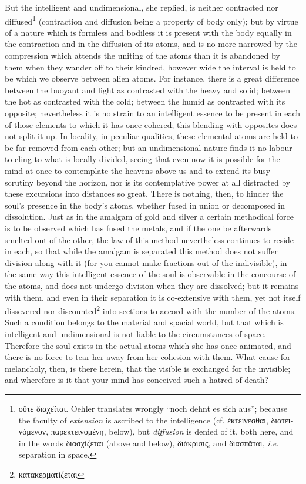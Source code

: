 But the intelligent and undimensional, she replied, is neither contracted nor diffused\footnote{\textgreek{οὔτε διαχεῖται}. Oehler translates wrongly “noch dehnt es sich aus”; because the faculty of \emph{extension} is ascribed to the intelligence (cf. \textgreek{ἐκτείνεσθαι, διατεινόμενον, παρεκτεινομένη}, below), but \emph{diffusion} is denied of it, both here, and in the words \textgreek{διασχίζεται} (above and below), \textgreek{διάκρισις}, and \textgreek{διασπᾶται}, \emph{i.e.} separation in space.} (contraction and diffusion being a property of body only); but by virtue of a nature which is formless and bodiless it is present with the body equally in the contraction and in the diffusion of its atoms, and is no more narrowed by the compression which attends the uniting of the atoms than it is abandoned by them when they wander off to their kindred, however wide the interval is held to be which we observe between alien atoms. For instance, there is a great difference between the buoyant and light as contrasted with the heavy and solid; between the hot as contrasted with the cold; between the humid as contrasted with its opposite; nevertheless it is no strain to an intelligent essence to be present in each of those elements to which it has once cohered; this blending with opposites does not split it up. In locality, in peculiar qualities, these elemental atoms are held to be far removed from each other; but an undimensional nature finds it no labour to cling to what is locally divided, seeing that even now it is possible for the mind at once to contemplate the heavens above us and to extend its busy scrutiny beyond the horizon, nor is its contemplative power at all distracted by these excursions into distances so great. There is nothing, then, to hinder the soul’s presence in the body’s atoms, whether fused in union or decomposed in dissolution. Just as in the amalgam of gold and silver a certain methodical force is to be observed which has fused the metals, and if the one be afterwards smelted out of the other, the law of this method nevertheless continues to reside in each, so that while the amalgam is separated this method does not suffer division along with it (for you cannot make fractions out of the indivisible), in the same way this intelligent essence of the soul is observable in the concourse of the atoms, and does not undergo division when they are dissolved; but it remains with them, and even in their separation it is co-extensive with them, yet not itself dissevered nor discounted\footnote{\textgreek{κατακερματίζεται}} into sections to accord with the number of the atoms. Such a condition belongs to the material and spacial world, but that which is intelligent and undimensional is not liable to the circumstances of space. Therefore the soul exists in the actual atoms which she has once animated, and there is no force to tear her away from her cohesion with them. What cause for melancholy, then, is there herein, that the visible is exchanged for the invisible; and wherefore is it that your mind has conceived such a hatred of death?


